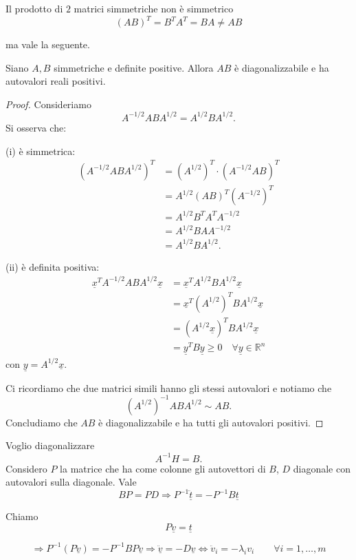 \begin{oss}{}
Il prodotto di \(2\) matrici simmetriche non è simmetrico
\[
(AB)^{T}=B^{T}A^{T}=BA\neq AB
\]

ma vale la seguente.
\end{oss}
\begin{lemma}{}
Siano \(A, B\) simmetriche e definite positive. Allora \(AB\) è diagonalizzabile e ha autovalori reali positivi.
\end{lemma}
\begin{proof}
Consideriamo
\[
A^{-1/2}ABA^{1/2}=A^{1/2}BA^{1/2}.
\]
Si osserva che:

\noindent (i) è simmetrica:
\begin{align*}
\left(A^{-1/2}ABA^{1/2}\right)^T &= \left(A^{1/2}\right)^T \cdot \left(A^{-1/2}AB\right)^T \\
&= A^{1/2}(AB)^T\left(A^{-1/2}\right)^T \\
&= A^{1/2}B^TA^TA^{-1/2} \\
&= A^{1/2}BAA^{-1/2} \\
&= A^{1/2}BA^{1/2}.
\end{align*}

\noindent (ii) è definita positiva:
\begin{align*}
\underline{x}^T A^{-1/2}ABA^{1/2}\underline{x} &= \underline{x}^T A^{1/2}BA^{1/2}\underline{x} \\
&= \underline{x}^T\left(A^{1/2}\right)^TBA^{1/2}\underline{x} \\
&= \left(A^{1/2}\underline{x}\right)^TBA^{1/2}\underline{x} \\
&= \underline{y}^TB\underline{y} \ge 0 \quad \forall \underline{y}\in \mathbb{R}^n
\end{align*}
con \(\underline{y}=A^{1/2}\underline{x}\).

Ci ricordiamo che due matrici simili hanno gli stessi autovalori e notiamo che
\[
\left(A^{1/2}\right)^{-1}ABA^{1/2}\sim AB.
\]
Concludiamo che \(AB\) è diagonalizzabile e ha tutti gli autovalori positivi.
\end{proof}

Voglio diagonalizzare
\[
A^{-1}H=B.
\]
Considero \(P\) la matrice che ha come colonne gli autovettori di \(B\), \(D\) diagonale con autovalori sulla diagonale. Vale
\[
BP=PD
\Rightarrow
P^{-1}\ddot{\underline t}=-P^{-1}B\underline t
\]

Chiamo
\[
P\underline v=\underline t
\]

\[
\Rightarrow
P^{-1}(P\ddot{\underline v})
=
-P^{-1}BP\underline v
\Rightarrow
\ddot{\underline v}
=
-D\underline v
\Longleftrightarrow
\ddot v_i=-\lambda_i v_i
\qquad
\forall i=1,\ldots,m
\]

